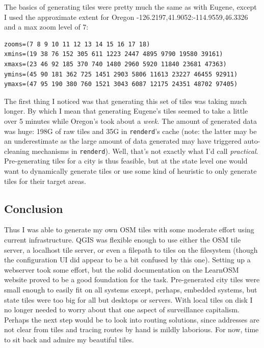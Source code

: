 \documentclass{article}
\begin{document}
The basics of generating tiles were pretty much the same as with Eugene, except I used the approximate extent for Oregon -126.2197,41.9052:-114.9559,46.3326 and a max zoom level of 7:

\begin{verbatim}
zooms=(7 8 9 10 11 12 13 14 15 16 17 18)
xmins=(19 38 76 152 305 611 1223 2447 4895 9790 19580 39161)
xmaxs=(23 46 92 185 370 740 1480 2960 5920 11840 23681 47363)
ymins=(45 90 181 362 725 1451 2903 5806 11613 23227 46455 92911)
ymaxs=(47 95 190 380 760 1521 3043 6087 12175 24351 48702 97405)
\end{verbatim}

The first thing I noticed was that generating this set of tiles was taking much longer.  By which I mean that generating Eugene's tiles seemed to take a little over 5 minutes while Oregon's took about a \emph{week}.  The amount of generated data was huge: 198G of raw tiles and 35G in \texttt{renderd}'s cache (note: the latter may be an underestimate as the large amount of data generated may have triggered auto-cleaning mechanisms in \texttt{renderd}).  Well, that's not exactly what I'd call \emph{practical}.  Pre-generating tiles for a city is thus feasible, but at the state level one would want to dynamically generate tiles or use some kind of heuristic to only generate tiles for their target areas.

\subsection{Conclusion}
Thus I was able to generate my own OSM tiles with some moderate effort using current infrastructure.  QGIS was flexible enough to use either the OSM tile server, a localhost tile server, or even a filepath to tiles on the filesystem (though the configuration UI did appear to be a bit confused by this one).  Setting up a webserver took some effort, but the solid documentation on the LearnOSM website proved to be a good foundation for the task.  Pre-generated city tiles were small enough to easily fit on all systems except, perhaps, embedded systems, but state tiles were too big for all but desktops or servers.  With local tiles on disk I no longer needed to worry about that one aspect of surveillance capitalism.  Perhaps the next step would be to look into routing solutions, since addresses are not clear from tiles and tracing routes by hand is mildly laborious.  For now, time to sit back and admire my beautiful tiles.


\end{document}
